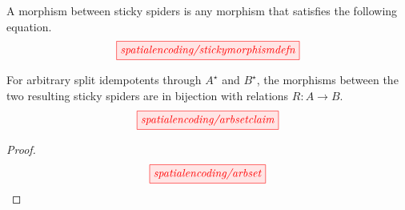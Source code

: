\begin{fullwidth}
\begin{defn}
A morphism between sticky spiders is any morphism that satisfies the following equation.
\[\scalebox{1}{\tikzfig{spatialencoding/stickymorphismdefn}}\]
\end{defn}

\begin{proposition}
For arbitrary split idempotents through $A^\star$ and $B^\star$, the morphisms between the two resulting sticky spiders are in bijection with relations $R: A \rightarrow B$.
\[\scalebox{1}{\tikzfig{spatialencoding/arbsetclaim}}\]
\begin{proof}
\[\scalebox{1}{\tikzfig{spatialencoding/arbset}}\]
\end{proof}
\end{proposition}


\end{fullwidth}
